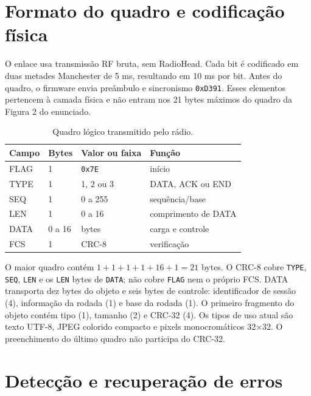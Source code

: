 \documentclass[12pt,a4paper]{article}
\begin{document}
\section{Formato do quadro e codificação física}
O enlace usa transmissão RF bruta, sem RadioHead. Cada bit é codificado em duas metades Manchester de 5 ms, resultando em 10 ms por bit. Antes do quadro, o firmware envia preâmbulo e sincronismo \texttt{0xD391}. Esses elementos pertencem à camada física e não entram nos 21 bytes máximos do quadro da Figura 2 do enunciado.

\begin{table}[h]
\centering
\caption{Quadro lógico transmitido pelo rádio.}
\begin{tabular}{llll}
\toprule
Campo & Bytes & Valor ou faixa & Função \\
\midrule
FLAG & 1 & \texttt{0x7E} & início \\
TYPE & 1 & 1, 2 ou 3 & DATA, ACK ou END \\
SEQ & 1 & 0 a 255 & sequência/base \\
LEN & 1 & 0 a 16 & comprimento de DATA \\
DATA & 0 a 16 & bytes & carga e controle \\
FCS & 1 & CRC-8 & verificação \\
\bottomrule
\end{tabular}
\end{table}

O maior quadro contém $1+1+1+1+16+1=21$ bytes. O CRC-8 cobre \texttt{TYPE}, \texttt{SEQ}, \texttt{LEN} e os \texttt{LEN} bytes de \texttt{DATA}; não cobre \texttt{FLAG} nem o próprio FCS. DATA transporta dez bytes do objeto e seis bytes de controle: identificador de sessão (4), informação da rodada (1) e base da rodada (1). O primeiro fragmento do objeto contém tipo (1), tamanho (2) e CRC-32 (4). Os tipos de uso atual são texto UTF-8, JPEG colorido compacto e pixels monocromáticos 32$\times$32. O preenchimento do último quadro não participa do CRC-32.

\section{Detecção e recuperação de erros}
\end{document}
